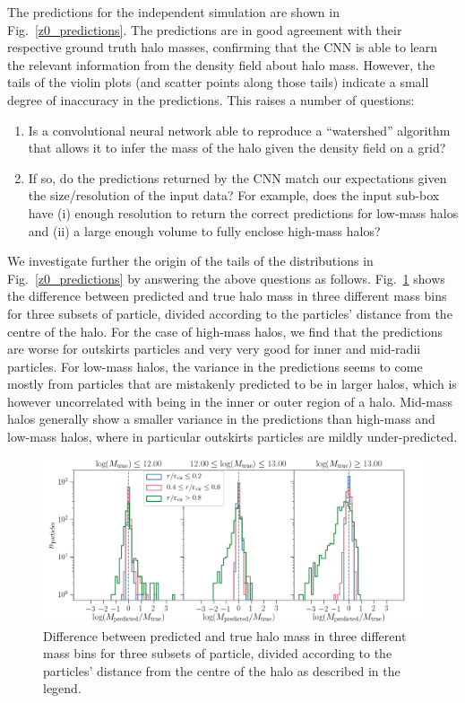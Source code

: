 \documentclass[11pt]{article}
\begin{document}
The predictions for the independent simulation are shown in Fig.~\ref{z0_predictions}. The predictions are in good agreement with their respective ground truth halo masses, confirming that the CNN is able to learn the relevant information from the density field about halo mass. However, the tails of the violin plots (and scatter points along those tails) indicate a small degree of inaccuracy in the predictions. This raises a number of questions:
\begin{enumerate}
	\item Is a convolutional neural network able to reproduce a ``watershed'' algorithm that allows it to infer the mass of the halo given the density field on a grid? 
	\item If so, do the predictions returned by the CNN match our expectations given the size/resolution of the input data? For example, does the input sub-box have (i) enough resolution to return the correct predictions for low-mass halos and (ii) a large enough volume to fully enclose high-mass halos?
\end{enumerate}

We investigate further the origin of the tails of the distributions in Fig.~\ref{z0_predictions} by answering the above questions as follows. Fig.~\ref{fig:histogram_radii} shows the difference between predicted and true halo mass in three different mass bins for three subsets of particle, divided according to the particles' distance from the centre of the halo. For the case of high-mass halos, we find that the predictions are worse for outskirts particles and very very good for inner and mid-radii particles. For low-mass halos, the variance in the predictions seems to come mostly from particles that are mistakenly predicted to be in larger halos, which is however uncorrelated with being in the inner or outer region of a halo. Mid-mass halos generally show a smaller variance in the predictions than high-mass and low-mass halos, where in particular outskirts particles are mildly under-predicted.

\begin{figure}
	\centering
	\includegraphics[width=\columnwidth]{z0/predictions_mass_and_radius_bins.png}
	\caption{Difference between predicted and true halo mass in three different mass bins for three subsets of particle, divided according to the particles' distance from the centre of the halo as described in the legend.}
	\label{fig:histogram_radii}
\end{figure}
\end{document}
